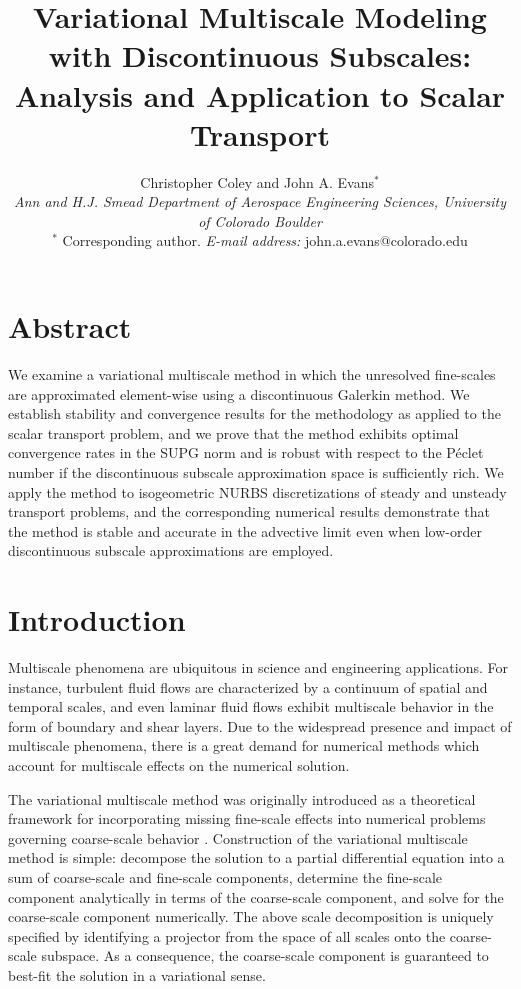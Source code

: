 \documentclass[11pt]{article}
\title{Variational Multiscale Modeling with Discontinuous Subscales:\\ Analysis and Application to Scalar Transport}
\author{Christopher Coley and John A. Evans$^{*}$ \\
\textit{\small Ann and H.J. Smead Department of Aerospace Engineering Sciences, University of Colorado Boulder}\\
$^*$ \small Corresponding author.  \textit{E-mail address:} john.a.evans@colorado.edu}
\date{}
\begin{document}
\maketitle

\section*{Abstract}

\noindent We examine a variational multiscale method in which the unresolved fine-scales are approximated element-wise using a discontinuous Galerkin method.  We establish stability and convergence results for the methodology as applied to the scalar transport problem, and we prove that the method exhibits optimal convergence rates in the SUPG norm and is robust with respect to the P\'{e}clet number if the discontinuous subscale approximation space is sufficiently rich.  We apply the method to isogeometric NURBS discretizations of steady and unsteady transport problems, and the corresponding numerical results demonstrate that the method is stable and accurate in the advective limit even when low-order discontinuous subscale approximations are employed.\\

\section{Introduction}

Multiscale phenomena are ubiquitous in science and engineering applications.  For instance, turbulent fluid flows are characterized by a continuum of spatial and temporal scales, and even laminar fluid flows exhibit multiscale behavior in the form of boundary and shear layers.  Due to the widespread presence and impact of multiscale phenomena, there is a great demand for numerical methods which account for multiscale effects on the numerical solution.

The variational multiscale method was originally introduced as a theoretical framework for incorporating missing fine-scale effects into numerical problems governing coarse-scale behavior \cite{Bazilevs07b,Hughes95a,Hughes98,Hughes99,Hughes07}.  Construction of the variational multiscale method is simple: decompose the solution to a partial differential equation into a sum of coarse-scale and fine-scale components, determine the fine-scale component analytically in terms of the coarse-scale component, and solve for the coarse-scale component numerically.  The above scale decomposition is uniquely specified by identifying a projector from the space of all scales onto the coarse-scale subspace.  As a consequence, the coarse-scale component is guaranteed to best-fit the solution in a variational sense.
\end{document}
